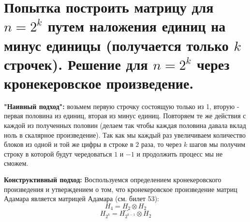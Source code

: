 \setcounter{section}{16}
\section{Попытка построить матрицу для $n = 2^k$ путем наложения единиц на минус единицы (получается только $k$ строчек). Решение для $n = 2^k$ через кронекеровское произведение.}
\par \textbf{"Наивный подход":} возьмем первую строчку состоящую только из 1, вторую - первая половина из единиц, вторая из минус единиц. Повторяем те же действия с каждой из полученных половин (делаем так чтобы каждая половина давала вклад ноль в скалярное произведение). Так как мы каждый раз увеличиваем количество блоков из одной и той же цифры в строке в $2$ раза, то через $k$ шагов мы получим строку в которой будут чередоваться $1$ и $-1$ и продолжить процесс мы не сможем.
\begin{figure}[h]
\end{figure}

\par \textbf{Конструктивный подход:} Воспользуемся определением кронекеровского произведения и утверждением о том, что кронекеровское произведение матриц Адамара является матрицей Адамара (см. билет 53):
$$H_4=H_2 \otimes H_2$$
$$\ldots$$
$$H_{2^k}=H_{2^{k-1}} \otimes H_2$$
